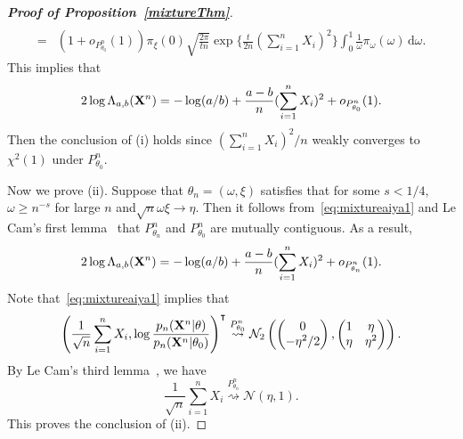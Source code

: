 \documentclass[11pt]{article}
\newcommand{\myT}{\intercal}
\theoremstyle{plain}
\theoremstyle{definition}
\theoremstyle{remark}
\begin{document}
\begin{appendices}
\begin{proof}[\textbf{Proof of Proposition~\ref{mixtureThm}}]
\begin{align*}
    \\
    =&
    (1+o_{P^n_{\theta_0}}(1))\pi_{\xi}(0)\sqrt{\frac{2\pi}{tn}}\exp \Big\{ \frac{t}{2n}(\sum_{i=1}^n X_i)^2\Big\} 
\int_{0}^1 
\frac{1}{\omega}
\pi_{\omega}(\omega)\, \mathrm d\omega.
\end{align*}
This implies that
\begin{equation*}
    2\log \Lambda_{a,b} (\mathbf{X}^n)=-\log(a/b)+\frac{a-b}{n}(\sum_{i=1}^n X_i)^2+o_{P^n_{\theta_0}}(1).
\end{equation*}
Then the conclusion of (i) holds since $(\sum_{i=1}^n X_i)^2/n$ weakly converges to $ \chi^2(1)$ under $P^n_{\theta_0}$.

Now we prove (ii). Suppose that $\theta_n=(\omega,\xi)$ satisfies that for some $s<1/4$, $\omega\geq n^{-s}$ for large $n$ and$\sqrt{n}\omega \xi \to \eta$.
Then it follows from~\eqref{eq:mixtureaiya1} and Le Cam's first lemma~\citep[Theorem 6.4]{van2000asymptotic} that
$P^n_{\theta_n}$ and $P^n_{\theta_0}$ are mutually contiguous.
As a result,
\begin{equation*}
    2\log \Lambda_{a,b} (\mathbf{X}^n) = -\log(a/b)+\frac{a-b}{n}(\sum_{i=1}^n X_i)^2+o_{P^n_{\theta_n}}(1).
\end{equation*}
Note that~\eqref{eq:mixtureaiya1} implies that
\begin{equation*}
    \left(\frac{1}{\sqrt n}\sum_{i=1}^n X_i,\log \frac{p_n(\BX^{n}|\theta)}{p_n(\BX^{n}|\theta_0)}\right)^\myT 
        \overset{P^n_{\theta_0}}{\rightsquigarrow}
        \mathcal{N}_2\left(
    \begin{pmatrix}
        0\\
        -{\eta^2}/{2}
    \end{pmatrix}
    ,
    \begin{pmatrix}
        1 & \eta\\
        \eta & \eta^2
    \end{pmatrix}
\right).
\end{equation*}
By Le Cam's third lemma~\citep[Example 6.7]{van2000asymptotic}, we have
\begin{equation*}
    \frac{1}{\sqrt n}\sum_{i=1}^n X_i
    \overset{P^n_{\theta_n}}{\rightsquigarrow} \mathcal{N}(\eta,1).
\end{equation*}
This proves the conclusion of (ii).

\end{proof}


\end{appendices}
\end{document}
